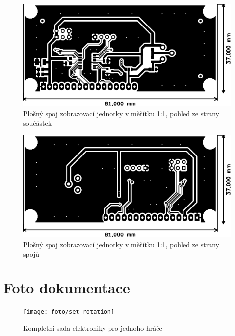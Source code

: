 \begin{figure}[h]
    \centering
    \includegraphics{pcb/display-top}
    \caption{Plošný spoj zobrazovací jednotky v měřítku 1:1, pohled ze strany součástek}
\end{figure}
\begin{figure}[h]
    \centering
    \includegraphics{pcb/display-bot}
    \caption{Plošný spoj zobrazovací jednotky v měřítku 1:1, pohled ze strany spojů}
\end{figure}


\chapter{Foto dokumentace}
\begin{figure}[h]
    \centering
    \texttt{[image: foto/set-rotation]}
    \caption{Kompletní sada elektroniky pro jednoho hráče}
\end{figure}
